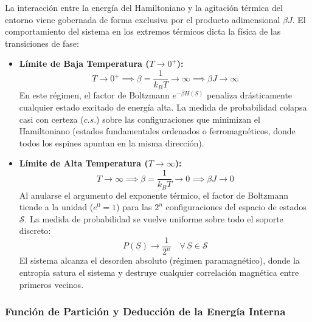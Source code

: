 \begin{notacion}
La interacción entre la energía del Hamiltoniano y la agitación térmica del entorno viene gobernada de forma exclusiva por el producto adimensional $\beta J$. El comportamiento del sistema en los extremos térmicos dicta la física de las transiciones de fase:
\begin{itemize}
    \item \textbf{Límite de Baja Temperatura ($T \to 0^+$):} 
    \[
    T \to 0^+ \implies \beta = \frac{1}{k_B T} \to \infty \implies \beta J \to \infty
    \]
    En este régimen, el factor de Boltzmann $e^{-\beta H(\underline{S})}$ penaliza drásticamente cualquier estado excitado de energía alta. La medida de probabilidad colapsa casi con certeza ($c.s.$) sobre las configuraciones que minimizan el Hamiltoniano (estados fundamentales ordenados o ferromagnéticos, donde todos los espines apuntan en la misma dirección).
    
    \item \textbf{Límite de Alta Temperatura ($T \to \infty$):} 
    \[
    T \to \infty \implies \beta = \frac{1}{k_B T} \to 0 \implies \beta J \to 0
    \]
    Al anularse el argumento del exponente térmico, el factor de Boltzmann tiende a la unidad ($e^0 = 1$) para las $2^n$ configuraciones del espacio de estados $\mathcal{S}$. La medida de probabilidad se vuelve uniforme sobre todo el soporte discreto:
    \[
    P(\underline{S}) \to \frac{1}{2^n} \quad \forall \, \underline{S} \in \mathcal{S}
    \]
    El sistema alcanza el desorden absoluto (régimen paramagnético), donde la entropía satura el sistema y destruye cualquier correlación magnética entre primeros vecinos.
\end{itemize}
\end{notacion}

\subsubsection{Función de Partición y Deducción de la Energía Interna}

